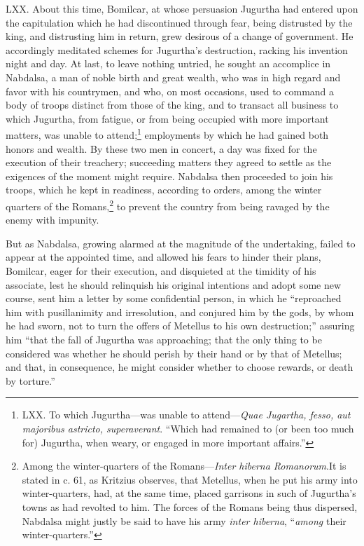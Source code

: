 LXX. About this time, Bomilcar, at whose persuasion Jugurtha had
entered upon the capitulation which he had discontinued through fear,
being distrusted by the king, and distrusting him in return, grew
desirous of a change of government. He accordingly meditated schemes
for Jugurtha's destruction, racking his invention night and day. At
last, to leave nothing untried, he sought an accomplice in Nabdalsa, a
man of noble birth and great wealth, who was in high regard and favor
with his countrymen, and who, on most occasions, used to command a
body of troops distinct from those of the king, and to transact all
business to which Jugurtha, from fatigue, or from being occupied with
more important matters, was unable to attend;\footnote{LXX. To which Jugurtha—was unable to attend—\emph{Quae Jugartha,
fesso, aut majoribus astricto, superaverant}. ``Which had remained to
(or been too much for) Jugurtha, when weary, or engaged in more
important affairs.''} employments by
which he had gained both honors and wealth. By these two men in
concert, a day was fixed for the execution of their treachery;
succeeding matters they agreed to settle as the exigences of the
moment might require. Nabdalsa then proceeded to join his troops,
which he kept in readiness, according to orders, among the winter
quarters of the Romans,\footnote{Among the winter-quarters of the Romans—\emph{Inter hiberna
Romanorum}.It is stated in c. 61, as Kritzius observes, that Metellus,
when he put his army into winter-quarters, had, at the same time,
placed garrisons in such of Jugurtha's towns as had revolted to him.
The forces of the Romans being thus dispersed, Nabdalsa might justly
be said to have his army \emph{inter hiberna}, ``\emph{among} their
winter-quarters.''} to prevent the country from being ravaged
by the enemy with impunity.

But as Nabdalsa, growing alarmed at the magnitude of the undertaking,
failed to appear at the appointed time, and allowed his fears to
hinder their plans, Bomilcar, eager for their execution, and
disquieted at the timidity of his associate, lest he should relinquish
his original intentions and adopt some new course, sent him a letter
by some confidential person, in which he ``reproached him with
pusillanimity and irresolution, and conjured him by the gods, by whom
he had sworn, not to turn the offers of Metellus to his own
destruction;'' assuring him ``that the fall of Jugurtha was approaching;
that the only thing to be considered was whether he should perish by
their hand or by that of Metellus; and that, in consequence, he might
consider whether to choose rewards, or death by torture.''

